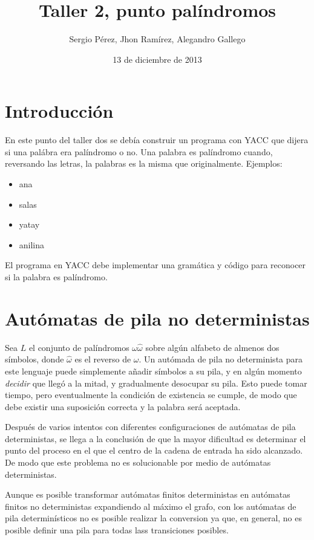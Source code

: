 \documentclass{article}
\begin{document}
\title{Taller 2, punto palíndromos}
\author{Sergio Pérez, Jhon Ramírez, Alegandro Gallego}
\date{13 de diciembre de 2013}
\maketitle

\section{Introducción}

En este punto del taller dos se debía construir un programa con YACC que dijera si una palábra era palíndromo o no. Una palabra es palíndromo cuando, reversando las letras, la palabras es la misma que originalmente. Ejemplos:

\begin{itemize}
\item ana
\item salas
\item yatay
\item anilina
\end{itemize}

El programa en YACC debe implementar una gramática y código para reconocer si la palabra es palíndromo.

\section{Autómatas de pila no deterministas}
Sea $L$ el conjunto de palíndromos $\omega\hat{\omega}$ sobre algún alfabeto de almenos dos símbolos, donde $\hat{\omega}$ es el reverso de $\omega$. Un autómada de pila no determinista para este lenguaje puede simplemente añadir símbolos a su pila, y en algún momento \emph{decidir} que llegó a la mitad, y gradualmente desocupar su pila. Esto puede tomar tiempo, pero eventualmente la condición de existencia se cumple, de modo que debe existir una suposición correcta y la palabra será aceptada.

Después de varios intentos con diferentes configuraciones de autómatas de pila deterministas, se llega a la conclusión de que la mayor dificultad es determinar el punto del proceso en el que el centro de la cadena de entrada ha sido alcanzado. De modo que este problema no es solucionable por medio de autómatas deterministas.

Aunque es posible transformar autómatas finitos deterministas en autómatas finitos no deterministas expandiendo al máximo el grafo, con los autómatas de pila determinísticos no es posible realizar la conversion ya que, en general, no es posible definir una pila para todas lass transiciones posibles.
\end{document}
